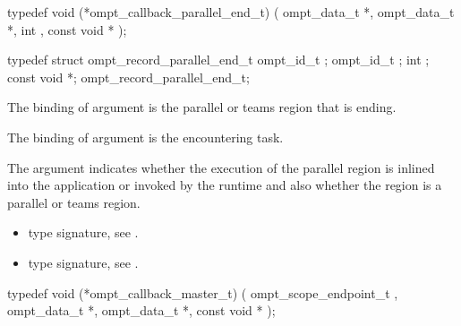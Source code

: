 \label{sec:ompt_callback_parallel_end_t}
\format

\begin{ccppspecific}
\begin{omptCallback}
typedef void (*ompt_callback_parallel_end_t) (
  ompt_data_t *,
  ompt_data_t *,
  int ,
  const void *
);
\end{omptCallback}
\end{ccppspecific}


\record

\begin{ccppspecific}
\begin{omptRecord}
typedef struct ompt_record_parallel_end_t {
  ompt_id_t ;
  ompt_id_t ;
  int ;
  const void *;
} ompt_record_parallel_end_t;
\end{omptRecord}
\end{ccppspecific}


\argdesc

The binding of argument  is the parallel or teams
region that is ending.

The binding of argument  is the encountering
task.

The argument  indicates whether the execution of the
parallel region is inlined into the application or invoked by the
runtime and also whether the region is a parallel or teams region.

\codeptrdesc

\crossreferences
\begin{itemize}
\item {} type signature, see
.
\item {} type signature, see
.
\end{itemize}

\label{sec:ompt_callback_master_t}
\format

\begin{ccppspecific}
\begin{omptCallback}
typedef void (*ompt_callback_master_t) (
  ompt_scope_endpoint_t ,
  ompt_data_t *,
  ompt_data_t *,
  const void *
);
\end{omptCallback}
\end{ccppspecific}


